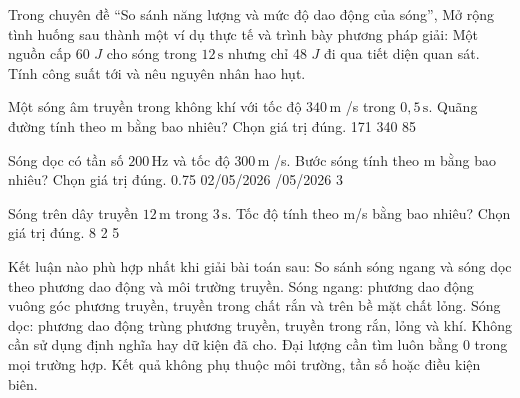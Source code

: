 \begin{ex}
Trong chuyên đề “So sánh năng lượng và mức độ dao động của sóng”, Mở rộng tình huống sau thành một ví dụ thực tế và trình bày phương pháp giải: Một nguồn cấp 60 $J$ cho sóng trong $12\,\text{s}$ nhưng chỉ 48 $J$ đi qua tiết diện quan sát. Tính công suất tới và nêu nguyên nhân hao hụt.
\choiceTF

\end{ex}

\begin{ex}
Một sóng âm truyền trong không khí với tốc độ $340\,\text{m}$ /s trong $0,5\,\text{s}$. Quãng đường tính theo m bằng bao nhiêu? Chọn giá trị đúng.
\choice
{171}
{}
{340}
{85}
\end{ex}

\begin{ex}
Sóng dọc có tần số $200\,\text{Hz}$ và tốc độ $300\,\text{m}$ /s. Bước sóng tính theo m bằng bao nhiêu? Chọn giá trị đúng.
\choice
{0.75}
{02/05/2026}
{/05/2026}
{3}
\end{ex}

\begin{ex}
Sóng trên dây truyền $12\,\text{m}$ trong $3\,\text{s}$. Tốc độ tính theo m/s bằng bao nhiêu? Chọn giá trị đúng.
\choice
{8}
{2}
{5}
{}
\end{ex}

\begin{ex}
Kết luận nào phù hợp nhất khi giải bài toán sau: So sánh sóng ngang và sóng dọc theo phương dao động và môi trường truyền.
\choice
{\True Sóng ngang: phương dao động vuông góc phương truyền, truyền trong chất rắn và trên bề mặt chất lỏng. Sóng dọc: phương dao động trùng phương truyền, truyền trong rắn, lỏng và khí.}
{Không cần sử dụng định nghĩa hay dữ kiện đã cho.}
{Đại lượng cần tìm luôn bằng 0 trong mọi trường hợp.}
{Kết quả không phụ thuộc môi trường, tần số hoặc điều kiện biên.}
\end{ex}

